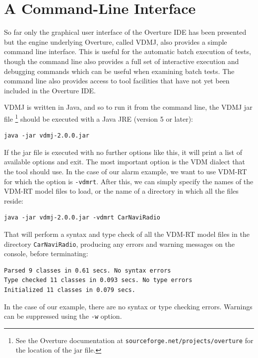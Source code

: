\section{A Command-Line Interface}\label{sec:cmdline}

So far only the graphical user interface of the Overture IDE has been
presented but the engine underlying Overture, called VDMJ, also
provides a simple command line interface.  This is useful for the
automatic batch execution of tests, though the command line also
provides a full set of interactive execution and debugging commands
which can be useful when examining batch tests. The command line also
provides access to tool facilities that have not yet been included in
the Overture IDE.

VDMJ is written in Java, and so to run it from the command line, the
VDMJ jar file \footnote{See the Overture documentation at
  \texttt{sourceforge.net/projects/overture} for the location of the
  jar file.}  should be executed with a Java JRE (version 5 or later):

\lstset{style=tool,language=}
\begin{lstlisting}
java -jar vdmj-2.0.0.jar
\end{lstlisting}

\noindent If the jar file is executed with no further options like this, it will
print a list of available options and exit. The most important option is the VDM
dialect that the tool should use. In the case of our alarm example, we want to
use VDM-RT for which the option is \verb|-vdmrt|. After this, we can simply
specify the names of the VDM-RT model files to load, or the name of a directory
in which all the files reside:

\begin{lstlisting}
java -jar vdmj-2.0.0.jar -vdmrt CarNaviRadio
\end{lstlisting}

\noindent That will perform a syntax and type check of all the VDM-RT model
files in the directory \verb|CarNaviRadio|, producing any errors and warning
messages on the console, before terminating:

\begin{lstlisting}
Parsed 9 classes in 0.61 secs. No syntax errors
Type checked 11 classes in 0.093 secs. No type errors
Initialized 11 classes in 0.079 secs. 
\end{lstlisting}

\noindent In the case of our example, there are no syntax or type checking
errors. Warnings can be suppressed using the \verb|-w| option.

